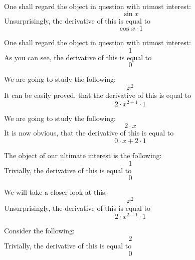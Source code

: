 \documentclass{article}
\begin{document}
One shall regard the object in question with utmost interest:
\begin{equation}
\sin x 
\end{equation}
Unsurprisingly, the derivative of this is equal to
\begin{equation}
\cos x \cdot 1 
\end{equation}

One shall regard the object in question with utmost interest:
\begin{equation}
1 
\end{equation}
As you can see, the derivative of this is equal to
\begin{equation}
0 
\end{equation}

We are going to study the following:
\begin{equation}
x ^{2 } 
\end{equation}
It can be easily proved, that the derivative of this is equal to
\begin{equation}
2 \cdot x ^{2 - 1 } \cdot 1 
\end{equation}

We are going to study the following:
\begin{equation}
2 \cdot x 
\end{equation}
It is now obvious, that the derivative of this is equal to
\begin{equation}
0 \cdot x + 2 \cdot 1 
\end{equation}

The object of our ultimate interest is the following:
\begin{equation}
1 
\end{equation}
Trivially, the derivative of this is equal to
\begin{equation}
0 
\end{equation}

We will take a closer look at this:
\begin{equation}
x ^{2 } 
\end{equation}
Unsurprisingly, the derivative of this is equal to
\begin{equation}
2 \cdot x ^{2 - 1 } \cdot 1 
\end{equation}

Consider the following:
\begin{equation}
2 
\end{equation}
Trivially, the derivative of this is equal to
\begin{equation}
0 
\end{equation}
\end{document}
